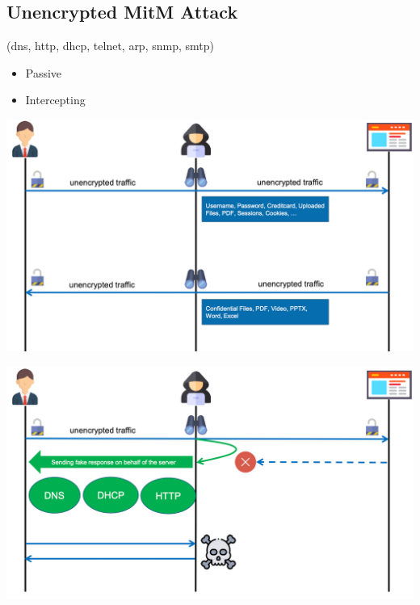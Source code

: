 \subsection{Unencrypted MitM Attack}\label{subsec:unencrypted-mitm-attack}
(dns, http, dhcp, telnet, arp, snmp, smtp)
\begin{itemize}
    \item Passive
    \item Intercepting
\end{itemize}
\begin{center}
    \vspace{-8pt}
    \includegraphics[width=1.0\linewidth]{./img/09-mitm/mitm_unenctypt_1}
    \vspace{-8pt}
\end{center}
\begin{center}
    \vspace{-8pt}
    \includegraphics[width=1.0\linewidth]{./img/09-mitm/mitm_unenctypt_2}
    \vspace{-8pt}
\end{center}

